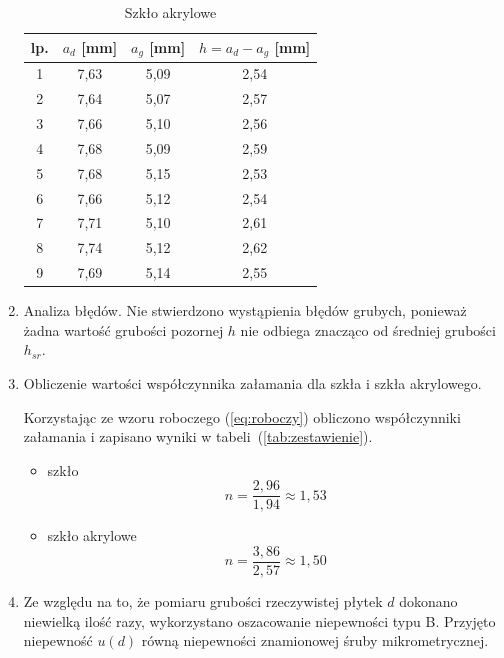\documentclass [a4paper,11pt]{article}
\begin{document}
\begin{enumerate}[label=\alph*)]
\begin{itemize}
		\end{itemize}
		\begin{table}[!h]
			\caption{Szkło akrylowe}
			\label{tab:pleksi}
			\begin{center}
				\begin{tabular}{|c|c|c|c|}
					\hline lp. & $a_d$  [mm] & $a_g$ [mm] & $h = a_d - a_g$ [mm]  \\
					\hline 1 & 7,63 & 5,09 & 2,54 \\
					\hline 2 & 7,64 & 5,07 & 2,57 \\
					\hline 3 & 7,66 & 5,10 & 2,56 \\
					\hline 4 & 7,68 & 5,09 & 2,59 \\
					\hline 5 & 7,68 & 5,15 & 2,53 \\
					\hline 6 & 7,66 & 5,12 & 2,54 \\
					\hline 7 & 7,71 & 5,10 & 2,61 \\
					\hline 8 & 7,74 & 5,12 & 2,62 \\
					\hline 9 & 7,69 & 5,14 & 2,55 \\
					\hline 
				\end{tabular} 
			\end{center}
		\end{table}
		
		
		
		
		\item Analiza błędów.
		Nie stwierdzono wystąpienia błędów grubych, ponieważ żadna wartość grubości pozornej $h$ nie odbiega znacząco od średniej grubości $h_{sr}$.
		
		\item Obliczenie wartości współczynnika załamania dla szkła i szkła akrylowego. 
		
		Korzystając ze wzoru roboczego (\ref{eq:roboczy}) obliczono współczynniki załamania i zapisano wyniki w tabeli~(\ref{tab:zestawienie}).
		\begin{itemize}
			\item szkło
			$$
			n=\frac{2,96}{1,94}\approx1,53
			$$
			\item szkło akrylowe
			$$
			n=\frac{3,86}{2,57}\approx1,50
			$$
		\end{itemize}
		
		\item Ze względu na to, że pomiaru grubości rzeczywistej płytek $d$ dokonano niewielką ilość razy, wykorzystano oszacowanie niepewności typu B. Przyjęto niepewność $u(d)$ równą niepewności znamionowej śruby mikrometrycznej.
		

\end{enumerate}
\end{document}
